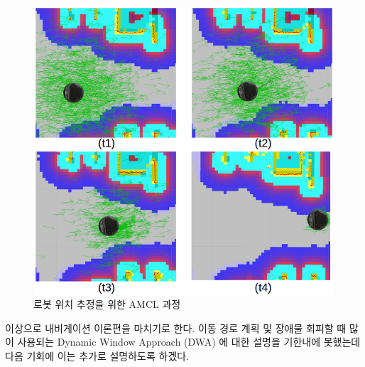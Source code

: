 \begin{figure}[h]
\centering
\includegraphics[width=0.9\columnwidth]{pictures/chapter11/amcl.png}
\caption{로봇 위치 추정을 위한 AMCL 과정}
\end{figure}

이상으로 내비게이션 이론편을 마치기로 한다. 이동 경로 계획 및 장애물 회피할 때 많이 사용되는 Dynamic Window Approach (DWA) 에 대한 설명을 기한내에 못했는데 다음 기회에 이는 추가로 설명하도록 하겠다.



